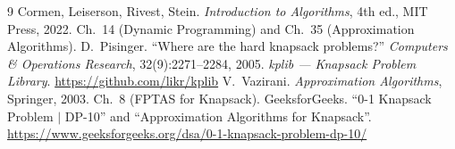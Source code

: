 \documentclass[11pt, a4paper]{article}
\begin{document}
\begin{thebibliography}{9}
\small
{} Cormen, Leiserson, Rivest, Stein. \textit{Introduction to
Algorithms}, 4th ed., MIT Press, 2022. Ch.\ 14 (Dynamic Programming) and
Ch.\ 35 (Approximation Algorithms).
 D.\ Pisinger. ``Where are the hard knapsack problems?''
\textit{Computers \& Operations Research}, 32(9):2271--2284, 2005.
 \textit{kplib --- Knapsack Problem Library}.
\url{https://github.com/likr/kplib}
 V.\ Vazirani. \textit{Approximation Algorithms}, Springer,
2003. Ch.\ 8 (FPTAS for Knapsack).
 GeeksforGeeks. ``0-1 Knapsack Problem $|$ DP-10'' and
``Approximation Algorithms for Knapsack''.
\url{https://www.geeksforgeeks.org/dsa/0-1-knapsack-problem-dp-10/}
\end{thebibliography}
\end{document}
